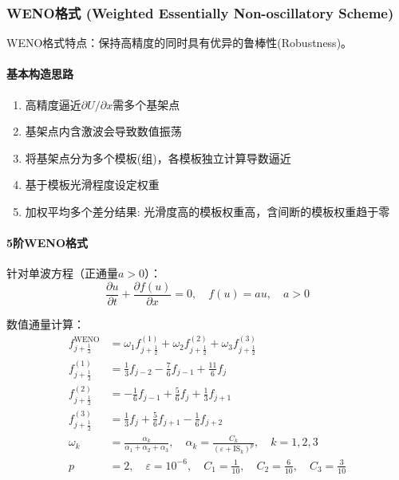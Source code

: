 \documentclass[12pt,a4paper]{article}
\begin{document}
\subsubsection{WENO格式 (Weighted Essentially Non-oscillatory Scheme)}
WENO格式特点：保持高精度的同时具有优异的鲁棒性(Robustness)。

\paragraph{基本构造思路}
\begin{enumerate}
    \item 高精度逼近$\partial U/\partial x$需多个基架点
    \item 基架点内含激波会导致数值振荡
    \item 将基架点分为多个模板(组)，各模板独立计算导数逼近
    \item 基于模板光滑程度设定权重
    \item 加权平均多个差分结果: 光滑度高的模板权重高，含间断的模板权重趋于零
\end{enumerate}

\paragraph{5阶WENO格式}
针对单波方程（正通量$a>0$）：
\begin{equation}
\frac{\partial u}{\partial t} + \frac{\partial f(u)}{\partial x} = 0, \quad f(u) = au, \quad a > 0
\end{equation}

数值通量计算：
\begin{align}
f_{j+\frac{1}{2}}^{\mathrm{WENO}} &= \omega_{1} f_{j+\frac{1}{2}}^{(1)} + \omega_{2} f_{j+\frac{1}{2}}^{(2)} + \omega_{3} f_{j+\frac{1}{2}}^{(3)} \\
f_{j+\frac{1}{2}}^{(1)} &= \frac{1}{3} f_{j-2} - \frac{7}{6} f_{j-1} + \frac{11}{6} f_{j} \\
f_{j+\frac{1}{2}}^{(2)} &= -\frac{1}{6} f_{j-1} + \frac{5}{6} f_{j} + \frac{1}{3} f_{j+1} \\
f_{j+\frac{1}{2}}^{(3)} &= \frac{1}{3} f_{j} + \frac{5}{6} f_{j+1} - \frac{1}{6} f_{j+2} \\
\omega_k &= \frac{\alpha_k}{\alpha_1 + \alpha_2 + \alpha_3}, \quad \alpha_k = \frac{C_k}{(\varepsilon + \mathrm{IS}_k)^p}, \quad k=1,2,3 \\
p &= 2, \quad \varepsilon = 10^{-6}, \quad C_1 = \frac{1}{10}, \quad C_2 = \frac{6}{10}, \quad C_3 = \frac{3}{10}
\end{align}
\end{document}
